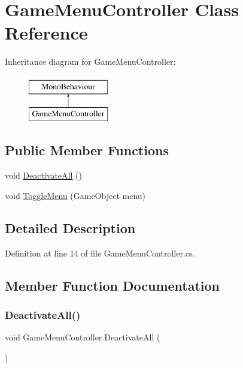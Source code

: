 \hypertarget{class_game_menu_controller}{}\section{Game\+Menu\+Controller Class Reference}
\label{class_game_menu_controller}
Inheritance diagram for Game\+Menu\+Controller\+:\begin{figure}[H]
\begin{center}
\leavevmode
\includegraphics[height=2.000000cm]{class_game_menu_controller}
\end{center}
\end{figure}
\subsection*{Public Member Functions}
\begin{DoxyCompactItemize}
\item 
void \hyperlink{class_game_menu_controller_a228d54b1eb82b5c177ceae1254be3960}{Deactivate\+All} ()
\item 
void \hyperlink{class_game_menu_controller_a591baeb9b3e7a3edb590acb91ae224af}{Toggle\+Menu} (Game\+Object menu)
\end{DoxyCompactItemize}


\subsection{Detailed Description}


Definition at line 14 of file Game\+Menu\+Controller.\+cs.



\subsection{Member Function Documentation}
\mbox{\label{class_game_menu_controller_a228d54b1eb82b5c177ceae1254be3960}} 
\subsubsection{\texorpdfstring{Deactivate\+All()}{DeactivateAll()}}
{\footnotesize\ttfamily void Game\+Menu\+Controller.\+Deactivate\+All (\begin{DoxyParamCaption}{ }\end{DoxyParamCaption})}



